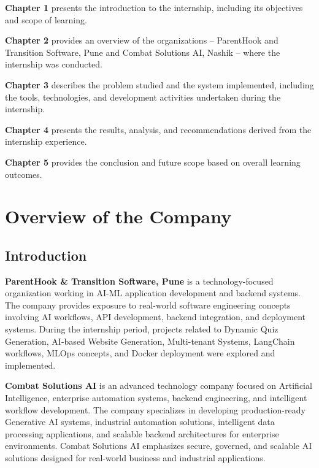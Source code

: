 \documentclass[12pt,a4paper]{report}
\begin{document}
\textbf{Chapter 1} presents the introduction to the internship, including its objectives and scope of learning.

\textbf{Chapter 2} provides an overview of the organizations -- ParentHook and Transition Software, Pune and Combat Solutions AI, Nashik -- where the internship was conducted.

\textbf{Chapter 3} describes the problem studied and the system implemented, including the tools, technologies, and development activities undertaken during the internship.

\textbf{Chapter 4} presents the results, analysis, and recommendations derived from the internship experience.

\textbf{Chapter 5} provides the conclusion and future scope based on overall learning outcomes.

\chapter{Overview of the Company}

\section{Introduction}

\textbf{ParentHook \& Transition Software, Pune} is a technology-focused organization working in AI-ML application development and backend systems. The company provides exposure to real-world software engineering concepts involving AI workflows, API development, backend integration, and deployment systems. During the internship period, projects related to Dynamic Quiz Generation, AI-based Website Generation, Multi-tenant Systems, LangChain workflows, MLOps concepts, and Docker deployment were explored and implemented.

\textbf{Combat Solutions AI} is an advanced technology company focused on Artificial Intelligence, enterprise automation systems, backend engineering, and intelligent workflow development. The company specializes in developing production-ready Generative AI systems, industrial automation solutions, intelligent data processing applications, and scalable backend architectures for enterprise environments. Combat Solutions AI emphasizes secure, governed, and scalable AI solutions designed for real-world business and industrial applications.
\end{document}

